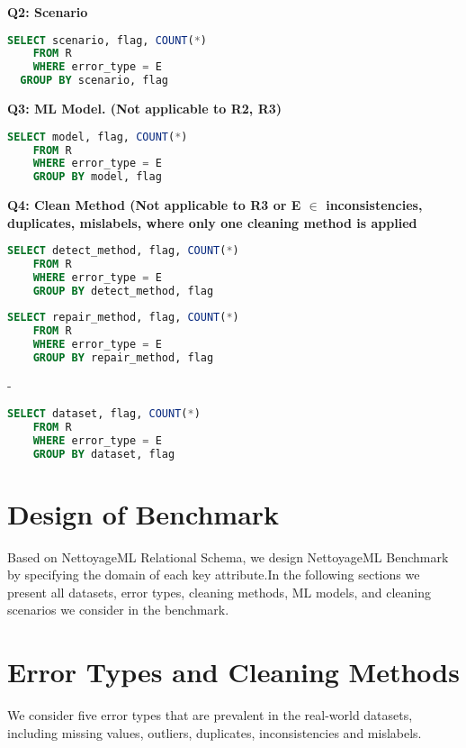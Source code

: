 \textbf{Q2: Scenario}
\begin{lstlisting}[language=SQL, caption=Q2: Scenario]
	SELECT scenario, flag, COUNT(*)
	FROM R
	WHERE error_type = E
  GROUP BY scenario, flag
\end{lstlisting}

\textbf{Q3: ML Model. (Not applicable to R2, R3)}
\begin{lstlisting}[language=SQL, caption=Q3: ML Model]
	SELECT model, flag, COUNT(*)
	FROM R
	WHERE error_type = E
	GROUP BY model, flag
\end{lstlisting}

\textbf{Q4: Clean Method (Not applicable to R3 or E $\in$ { inconsistencies, duplicates, mislabels}, where only one cleaning method is applied}
\begin{lstlisting}[language=SQL, caption=Q4.1:Clean Method]
	SELECT detect_method, flag, COUNT(*)
	FROM R
	WHERE error_type = E
	GROUP BY detect_method, flag
\end{lstlisting}

\begin{lstlisting}[language=SQL, caption=Q4.2:Clean Method]
	SELECT repair_method, flag, COUNT(*)
	FROM R
	WHERE error_type = E
	GROUP BY repair_method, flag
\end{lstlisting}
-\\
\begin{lstlisting}[language=SQL, caption=Q5: Dataset]
	SELECT dataset, flag, COUNT(*)
	FROM R
	WHERE error_type = E
	GROUP BY dataset, flag
\end{lstlisting}

\section{Design of Benchmark}

Based on NettoyageML Relational Schema, we design NettoyageML Benchmark by specifying the domain of each key attribute.In the following sections we present all datasets, error types, cleaning methods, ML models, and cleaning scenarios we consider in the benchmark.

\section{Error Types and Cleaning Methods}
We consider five error types that are prevalent in the real-world
datasets, including missing values, outliers, duplicates, inconsistencies and mislabels. 

